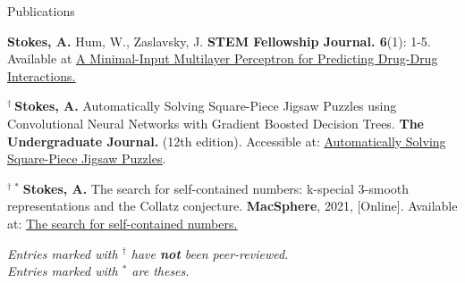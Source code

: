 \begin{rSection}{Publications}
\begin{enumerate}[label={[\arabic*]}]
  \item {\bf Stokes, A.} Hum, W., Zaslavsky, J. \textbf{STEM Fellowship Journal. 6}(1): 1-5. Available at \underline{\href{https://journal.stemfellowship.org/doi/10.17975/sfj-2020-006}{A Minimal-Input Multilayer Perceptron for Predicting Drug-Drug Interactions.}}
  
  \item $^\dagger \ ${\bf Stokes, A.} Automatically Solving Square-Piece Jigsaw Puzzles using Convolutional Neural Networks with Gradient Boosted Decision Trees. \textbf{The Undergraduate Journal.} (12th edition). Accessible at: \underline{\href{https://gua.soutron.net/Portal/Default/en-GB/RecordView/Index/61}{Automatically Solving Square-Piece Jigsaw Puzzles}}.
  \item $^{\dagger \ \ast \ }${\bf Stokes, A.} The search for self-contained numbers: k-special 3-smooth representations and the Collatz conjecture. \textbf{MacSphere}, 2021, [Online]. Available at: \underline{\href{https://macsphere.mcmaster.ca/handle/11375/27543}{The search for self-contained numbers.}}

\end{enumerate}

\smallskip
{\em Entries marked with $^\dagger$ have \textbf{not} been peer-reviewed.}\\
{\em Entries marked with $^\ast$ are theses.}

\end{rSection}